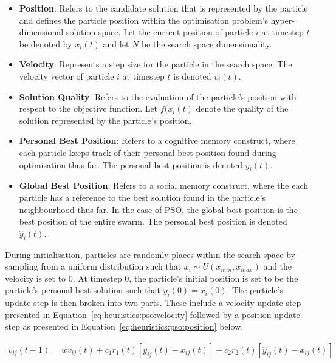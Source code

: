 \begin{itemize}
      \item \textbf{Position}: Refers to the candidate solution that is represented by the particle and defines the particle position within the optimisation problem's hyper-dimensional solution space. Let the current position of particle $i$ at timestep $t$ be denoted by $x_{i}(t)$ and let $N$ be the search space dimensionality.

      \item \textbf{Velocity}: Represents a step size for the particle in the search space. The velocity vector of particle $i$ at timestep $t$ is denoted $v_{i}(t)$.

      \item \textbf{Solution Quality}: Refers to the evaluation of the particle's position with respect to the objective function. Let $f(x_{i}(t)$ denote the quality of the solution represented by the particle's position.

      \item \textbf{Personal Best Position}: Refers to a cognitive memory construct, where each particle keeps track of their personal best position found during optimisation thus far. The personal best position is denoted $y_{i}(t)$.

      \item \textbf{Global Best Position}: Refers to a social memory construct, where the each particle has a reference to the best solution found in the particle's neighbourhood thus far. In the case of  \acs{PSO}, the global best position is the best position of the entire swarm. The personal best position is denoted $\hat{y}_{i}(t)$.
\end{itemize}

\noindent
During initialisation, particles are randomly places within the search space by sampling from a uniform distribution such that $x_{i} \sim U(x_{min}, x_{max})$ and the velocity is set to 0. At timestep 0, the particle's initial position is set to be the particle's personal best solution such that $y_{i}(0) = x_{i}(0)$. The particle's update step is then broken into two parts. These include a velocity update step presented in Equation~\eqref{eq:heuristics:pso:velocity} followed by a position update step as presented in Equation~\eqref{eq:heuristics:pso:position} below.

\begin{equation}
      \label{eq:heuristics:pso:velocity}
      \begin{split}
            v_{ij}(t+1) = wv_{ij}(t) + c_{1}r_{1}(t)[y_{ij}(t) - x_{ij}(t)] + c_{2}r_{2}(t)[\hat{y}_{ij}(t) - x_{ij}(t)]
      \end{split}
\end{equation}

